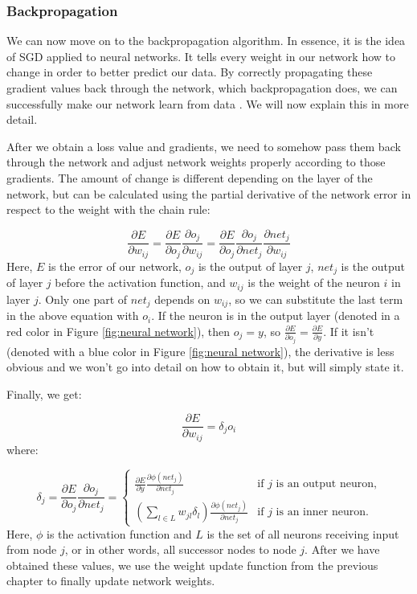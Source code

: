 \documentclass[times, utf8, diplomski, english]{fer_eng}
\begin{document}
\subsubsection{Backpropagation}
\label{subsubsec:backpropagation}

We can now move on to the backpropagation algorithm. In essence, it is the idea of SGD applied to neural networks. It tells every weight in our network how to change in order to better predict our data. By correctly propagating these gradient values back through the network, which backpropagation does, we can successfully make our network learn from data \cite{Goodfellow-et-al-2016}. We will now explain this in more detail.

After we obtain a loss value and gradients, we need to somehow pass them back through the network and adjust network weights properly according to those gradients. The amount of change is different depending on the layer of the network, but can be calculated using the partial derivative of the network error in respect to the weight with the chain rule:

\[ \frac{\partial E}{\partial w_{ij}} = \frac{\partial E}{\partial o_j} \frac{\partial o_j}{\partial w_{ij}} = \frac{\partial E}{\partial o_j} \frac{\partial o_j}{\partial net_j} \frac{\partial net_j}{\partial w_{ij}}\]
Here, $E$ is the error of our network, $o_j$ is the output of layer $j$, $net_j$ is the output of layer $j$ before the activation function, and $w_{ij}$ is the weight of the neuron $i$ in layer $j$. Only one part of $net_j$ depends on $w_{ij}$, so we can substitute the last term in the above equation with $o_i$. If the neuron is in the output layer (denoted in a red color in Figure \ref{fig:neural network}), then $o_j = y$, so $\frac{\partial E}{\partial o_{j}} = \frac{\partial E}{\partial y}$. If it isn't (denoted with a blue color in Figure \ref{fig:neural network}), the derivative is less obvious and we won't go into detail on how to obtain it, but will simply state it.

Finally, we get:

\[ \frac{\partial E}{\partial w_{ij}} = \delta_j o_i \]
where:

\[ \delta_j = \frac{\partial E}{\partial o_j} \frac{\partial o_j}{\partial net_j} = \begin{cases}
	\frac{\partial E}{\partial y} \frac{\partial \phi(net_j)}{\partial net_j} & \text{if $j$ is an output neuron,} \\
	(\sum_{l \in L} w_{jl} \delta_l) \frac{\partial \phi(net_j)}{\partial net_j} & \text{if $j$ is an inner neuron.}
\end{cases}
\]
Here, $\phi$ is the activation function and $L$ is the set of all neurons receiving input from node $j$, or in other words, all successor nodes to node $j$. After we have obtained these values, we use the weight update function from the previous chapter to finally update network weights.
\end{document}
